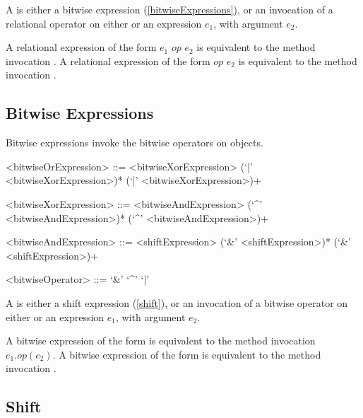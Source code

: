 \documentclass[makeidx]{article}
\begin{document}
{\LMHash{}%
A  is either a bitwise expression
(\ref{bitwiseExpressions}),
or an invocation of a relational operator on either \SUPER{}
or an expression $e_1$, with argument $e_2$.

\LMHash{}%
A relational expression of the form $e_1$ $op$ $e_2$ is equivalent to
the method invocation .
A relational expression of the form \SUPER{} $op$ $e_2$ is equivalent to
the method invocation .


\subsection{Bitwise Expressions}

\LMHash{}%
Bitwise expressions invoke the bitwise operators on objects.

\begin{grammar}
<bitwiseOrExpression> ::= \gnewline{}
  <bitwiseXorExpression> (`|' <bitwiseXorExpression>)*
  \alt \SUPER{} (`|' <bitwiseXorExpression>)+

<bitwiseXorExpression> ::= \gnewline{}
  <bitwiseAndExpression> (`^' <bitwiseAndExpression>)*
  \alt \SUPER{} (`^' <bitwiseAndExpression>)+

<bitwiseAndExpression> ::= <shiftExpression> (`\&' <shiftExpression>)*
  \alt \SUPER{} (`\&' <shiftExpression>)+

<bitwiseOperator> ::= `\&'
  \alt `^'
  \alt `|'
\end{grammar}

\LMHash{}%
A  is either a shift expression (\ref{shift}),
or an invocation of a bitwise operator
on either \SUPER{} or an expression $e_1$,
with argument $e_2$.

\LMHash{}%
A bitwise expression of the form  is equivalent to
the method invocation $e_1.op(e_2)$.
A bitwise expression of the form  is equivalent to
the method invocation .



\subsection{Shift}

}
\end{document}

